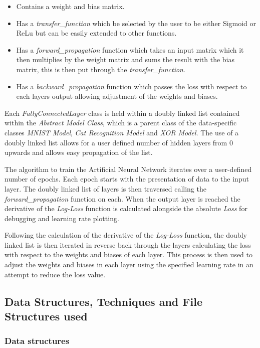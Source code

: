 \documentclass[./project-report/src/latex/project-report.tex]{subfiles}
\begin{document}
\begin{itemize}
    \item Contains a weight and bias matrix.
	\item Has a \textit{transfer\_function} which be selected by the user to be either Sigmoid or ReLu but can be easily extended to other functions.
    \item Has a \textit{forward\_propagation} function which takes an input matrix which it then multiplies by the weight matrix and sums the result with the bias matrix, this 
		  is then put through the \textit{transfer\_function}.
    \item Has a \textit{backward\_propagation} function which passes the loss with respect to each layers output allowing adjustment of the weights and biases.
\end{itemize}

Each \textit{FullyConnectedLayer} class is held within a doubly linked list contained within the \textit{Abstract Model Class}, which is a parent class of the 
data-specific classes \textit{MNIST Model}, \textit{Cat Recognition Model} and \textit{XOR Model}. The use of a doubly linked list allows for a user defined number of hidden 
layers from 0 upwards and allows easy propagation of the list.

The algorithm to train the Artificial Neural Network iterates over a user-defined number of epochs. Each epoch starts with the presentation of data to the input layer. The 
doubly linked list of layers is then traversed calling the \textit{forward\_propagation} function on each. When the output layer is reached the derivative of the 
\textit{Log-Loss} function is calculated alongside the absolute \textit{Loss} for debugging and learning rate plotting. 

Following the calculation of the derivative of the \textit{Log-Loss} function, the doubly linked list is then iterated in reverse back through the layers calculating the loss 
with respect to the weights and biases of each layer. This process is then used to adjust the weights and biases in each layer using the specified learning rate in an attempt 
to reduce the loss value.

\subsection{Data Structures, Techniques and File Structures used}

\subsubsection{Data structures}
\end{document}
